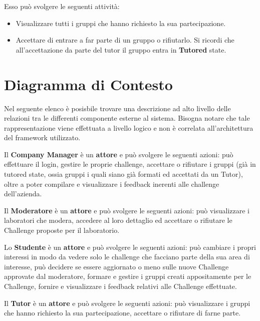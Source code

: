 Esso può svolgere le seguenti attività:
\begin{itemize}
    \item Visualizzare tutti i gruppi che hanno richiesto la sua partecipazione. 
    \item Accettare di entrare a far parte di un gruppo o rifiutarlo. Si ricordi che all'accettazione da parte del tutor il gruppo entra in \textbf{Tutored }state. 
\end{itemize}

\section{Diagramma di Contesto}

Nel seguente elenco è posisbile trovare una descrizione ad alto livello delle relazioni tra le differenti componente esterne al sistema. Bisogna notare che tale rappresentazione viene effettuata a livello logico e non è correlata all'architettura del framework utilizzato.

Il \textbf{Company Manager} è un \textbf{attore} e può svolgere le seguenti azioni: può effettuare il login, gestire le proprie challenge, accettare o rifiutare i gruppi (già in tutored state, ossia gruppi i quali siano già formati ed accettati da un Tutor), oltre a poter compilare e visualizzare i feedback inerenti alle challenge dell'azienda.

Il \textbf{Moderatore} è un \textbf{attore} e può svolgere le seguenti azioni: può visualizzare i laboratori che modera, accedere al loro dettaglio ed accettare o rifiutare le Challenge proposte per il laboratorio.

Lo \textbf{Studente} è un \textbf{attore} e può svolgere le seguenti azioni: può cambiare i propri interessi in modo da vedere solo le challenge che facciano parte della sua area di interesse, può decidere se essere aggiornato o meno sulle nuove Challenge approvate dal moderatore, formare e gestire i gruppi creati appositamente per le Challenge, fornire e visualizzare i feedback relativi alle Challenge effettuate. 

Il \textbf{Tutor} è un \textbf{attore} e può svolgere le seguenti azioni: può visualizzare i gruppi che hanno richiesto la sua partecipazione, accettare o rifiutare di farne parte.

